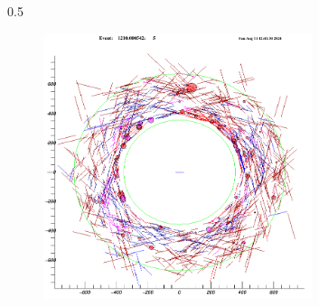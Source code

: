 \documentclass{beamer}
\begin{document}
\begin{frame}
\begin{columns}
\begin{column}{0.5\framewidth}
\begin{figure}[!h]
        \label{fig:bef}
\end{figure}
     \begin{figure}[!h]
        \centering
        \includegraphics[width =0.7\textwidth]{figures/png/Screenshot_20240811_124245.png}
        
        \label{fig:af}
    \end{figure}
\end{column}
\end{columns}
\end{frame}
\end{document}
